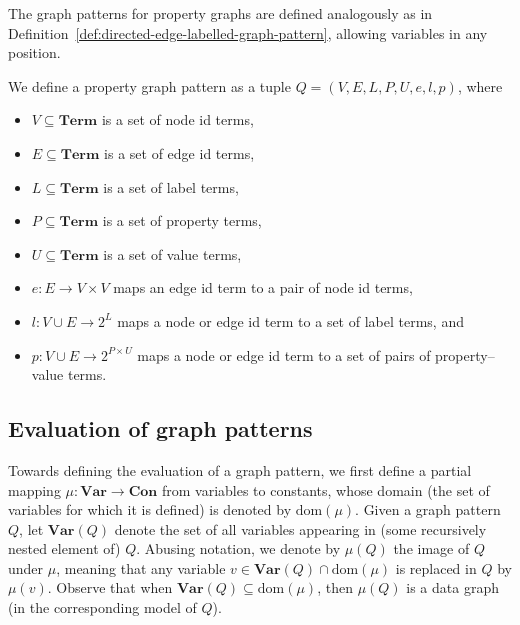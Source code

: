 The graph patterns for property graphs are defined analogously as in Definition~\ref{def:directed-edge-labelled-graph-pattern}, allowing variables in any position.
    
\begin{definition}\label{def:property-graph-pattern}
    We define a property graph pattern as a tuple $Q = (V, E, L, P, U, e, l, p)$, where
    \begin{itemize}
        \item $V \subseteq \textbf{Term}$ is a set of node id terms,
        \item $E \subseteq \textbf{Term}$ is a set of edge id terms,
        \item $L \subseteq \textbf{Term}$ is a set of label terms,
        \item $P \subseteq \textbf{Term}$ is a set of property terms,
        \item $U \subseteq \textbf{Term}$ is a set of value terms,
        \item $e : E \to V \times V$ maps an edge id term to a pair of node id terms,
        \item $l : V \cup E \to 2^L$ maps a node or edge id term to a set of label terms, and
        \item $p : V \cup E \to 2^{P \times U}$ maps a node or edge id term to a set of pairs of property–value terms.
    \end{itemize}
\end{definition}

\subsection{Evaluation of graph patterns}
Towards defining the evaluation of a graph pattern, we first define a partial mapping $\mu : \textbf{Var} \to \textbf{Con}$ from variables to constants, whose domain (the set of variables for which it is defined) is denoted by $\text{dom}(\mu)$. Given a graph pattern $Q$, let $\textbf{Var}(Q)$ denote the set of all variables appearing in (some recursively nested element of) $Q$. Abusing notation, we denote by $\mu(Q)$ the image of $Q$ under $\mu$, meaning that any variable $v \in \textbf{Var}(Q) \cap \text{dom}(\mu)$ is replaced in $Q$ by $\mu(v)$. Observe that when $\textbf{Var}(Q) \subseteq \text{dom}(\mu)$, then $\mu(Q)$ is a data graph (in the corresponding model of $Q$).

